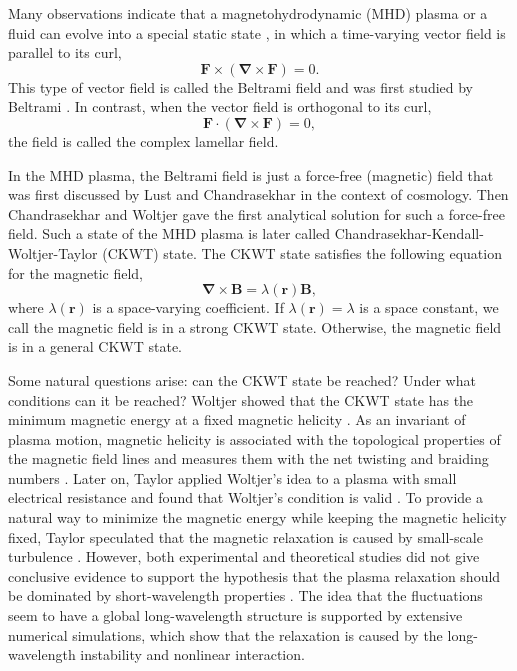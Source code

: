 \documentclass[english,aps,superscriptaddress,preprint]{revtex4-1}
\begin{document}
Many observations indicate that a magnetohydrodynamic (MHD) plasma
or a fluid can evolve into a special static state \citep{Robinson1969,Bodin1980,Ortolani1993,Sarff1997,Yagi1999,Sarff2003,Ding2004,Prager2005,Lorenzini2009},
in which a time-varying vector field is parallel to its curl, 
\begin{equation}
\boldsymbol{F}\times(\boldsymbol{\nabla}\times\boldsymbol{F})=0.
\end{equation}
This type of vector field is called the Beltrami field and was first
studied by Beltrami \citep{Beltrami1889}. In contrast, when the vector
field is orthogonal to its curl, 
\begin{equation}
\boldsymbol{F}\cdot(\boldsymbol{\nabla}\times\boldsymbol{F})=0,
\end{equation}
the field is called the complex lamellar field.

In the MHD plasma, the Beltrami field is just a force-free (magnetic)
field that was first discussed by Lust \citep{Lust1954} and Chandrasekhar
\citep{Chandrasekhar1957} in the context of cosmology. Then Chandrasekhar
and Woltjer \citep{Chandrasekhar1958,Woltjer1958} gave the first
analytical solution for such a force-free field. Such a state of the
MHD plasma is later called Chandrasekhar-Kendall-Woltjer-Taylor (CKWT)
state. The CKWT state satisfies the following equation for the magnetic
field, 
\begin{equation}
\boldsymbol{\nabla}\times\boldsymbol{B}=\lambda(\boldsymbol{r})\boldsymbol{B},
\end{equation}
where $\lambda(\boldsymbol{r})$ is a space-varying coefficient. If
$\lambda(\boldsymbol{r})=\lambda$ is a space constant, we call the
magnetic field is in a strong CKWT state. Otherwise, the magnetic
field is in a general CKWT state.

Some natural questions arise: can the CKWT state be reached? Under
what conditions can it be reached? Woltjer showed that the CKWT state
has the minimum magnetic energy at a fixed magnetic helicity \citep{Woltjer1958}.
As an invariant of plasma motion, magnetic helicity is associated
with the topological properties of the magnetic field lines and measures
them with the net twisting and braiding numbers \citep{Wells1969,Moffatt1978,Berger1984,Arnold1999}.
Later on, Taylor applied Woltjer's idea to a plasma with small electrical
resistance and found that Woltjer's condition is valid \citep{Taylor1974,Taylor1986}.
To provide a natural way to minimize the magnetic energy while keeping
the magnetic helicity fixed, Taylor speculated that the magnetic relaxation
is caused by small-scale turbulence \citep{Taylor1974,Taylor1986,Schnack2009}.
However, both experimental and theoretical studies did not give conclusive
evidence to support the hypothesis that the plasma relaxation should
be dominated by short-wavelength properties \citep{Robinson1969,Bodin1980,Caramana1983,Schnack1985,Strauss1985,Kusano1987,Ortolani1993,Holmes1988,Ho1991,Sarff1997,Yagi1999,Sarff2003,Diamond2003,Ding2004,Prager2005,Marrelli2005,Lorenzini2009}.
The idea that the fluctuations seem to have a global long-wavelength
structure is supported by extensive numerical simulations, which show
that the relaxation is caused by the long-wavelength instability and
nonlinear interaction.
\end{document}
